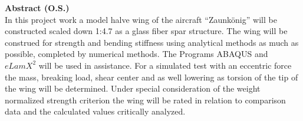 

\noindent\large{\textbf{Abstract (O.S.)}}~\\

\noindent In this project work a model halve wing of the aircraft “Zaunkönig” will be constructed scaled down 1:4.7 as a glass fiber spar structure. The wing will be construed for strength and bending stiffness using analytical methods as much as possible, completed by numerical methods. The Programs ABAQUS and $ eLamX^{2} $ will be used in assistance. For a simulated test with an eccentric force the mass, breaking load, shear center and as well lowering as torsion of the tip of the wing will be determined. Under special consideration of the weight normalized strength criterion the wing will be rated in relation to comparison data and the calculated values critically analyzed. 